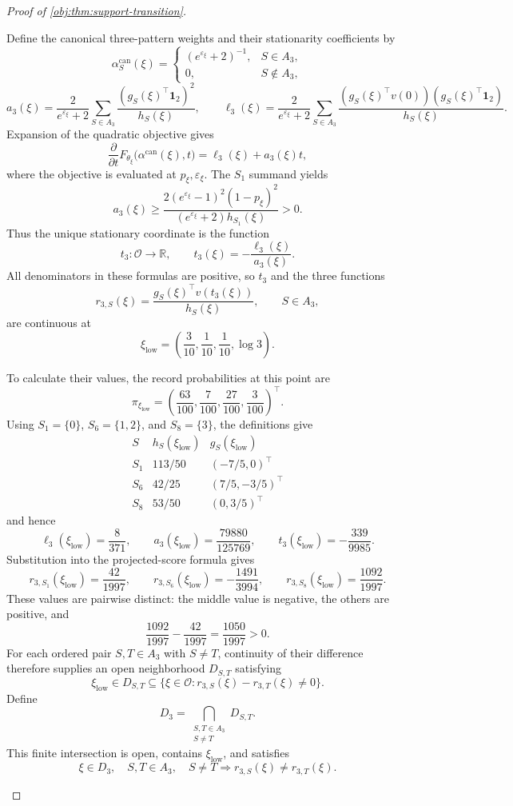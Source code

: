 \documentclass[11pt]{article}
\begin{document}
\begin{proof}[Proof of \cref{obj:thm:support-transition}]
\begin{enumerate}
Define the canonical three-pattern weights and their stationarity coefficients by
\[
\alpha^{\mathrm{can}}_S(\xi)=
\begin{cases}
(e^{\varepsilon_\xi}+2)^{-1},&S\in A_3,\\
0,&S\notin A_3,
\end{cases}
\]
\[
a_3(\xi)=\frac{2}{e^{\varepsilon_\xi}+2}
 \sum_{S\in A_3}\frac{(g_S(\xi)^\top\mathbf1_2)^2}{h_S(\xi)},
\qquad
\ell_3(\xi)=\frac{2}{e^{\varepsilon_\xi}+2}
 \sum_{S\in A_3}
 \frac{(g_S(\xi)^\top v(0))(g_S(\xi)^\top\mathbf1_2)}{h_S(\xi)}.
\]
Expansion of the quadratic objective gives
\[
\frac{\partial}{\partial t}
F_{\theta_\xi}\bigl(\alpha^{\mathrm{can}}(\xi),t\bigr)
=\ell_3(\xi)+a_3(\xi)t,
\]
where the objective is evaluated at \(p_\xi,\varepsilon_\xi\). The \(S_1\) summand yields
\[
a_3(\xi)\ge
\frac{2(e^{\varepsilon_\xi}-1)^2(1-p_\xi)^2}
 {(e^{\varepsilon_\xi}+2)h_{S_1}(\xi)}>0.
\]
Thus the unique stationary coordinate is the function
\[
t_3:\mathcal O\longrightarrow\mathbb R,
\qquad
t_3(\xi)=-\frac{\ell_3(\xi)}{a_3(\xi)}.
\]
All denominators in these formulas are positive, so \(t_3\) and the three functions
\[
r_{3,S}(\xi)=
\frac{g_S(\xi)^\top v(t_3(\xi))}{h_S(\xi)},
\qquad S\in A_3,
\]
are continuous at
\[
\xi_{\mathrm{low}}
=\left(\frac3{10},\frac1{10},\frac1{10},\log 3\right).
\]

To calculate their values, the record probabilities at this point are
\[
\pi_{\xi_{\mathrm{low}}}
=\left(\frac{63}{100},\frac7{100},\frac{27}{100},\frac3{100}\right)^\top.
\]
Using \(S_1=\{0\}\), \(S_6=\{1,2\}\), and \(S_8=\{3\}\), the definitions give
\[
\begin{array}{c|c|c}
S&h_S(\xi_{\mathrm{low}})&g_S(\xi_{\mathrm{low}})\\ \hline
S_1&113/50&(-7/5,0)^\top\\
S_6&42/25&(7/5,-3/5)^\top\\
S_8&53/50&(0,3/5)^\top
\end{array}
\]
and hence
\[
\ell_3(\xi_{\mathrm{low}})=\frac8{371},
\qquad
a_3(\xi_{\mathrm{low}})=\frac{79880}{125769},
\qquad
t_3(\xi_{\mathrm{low}})=-\frac{339}{9985}.
\]
Substitution into the projected-score formula gives
\[
r_{3,S_1}(\xi_{\mathrm{low}})=\frac{42}{1997},
\qquad
r_{3,S_6}(\xi_{\mathrm{low}})=-\frac{1491}{3994},
\qquad
r_{3,S_8}(\xi_{\mathrm{low}})=\frac{1092}{1997}.
\]
These values are pairwise distinct: the middle value is negative, the others are positive, and
\[
\frac{1092}{1997}-\frac{42}{1997}=\frac{1050}{1997}>0.
\]
For each ordered pair \(S,T\in A_3\) with \(S\ne T\), continuity of their difference therefore supplies an open neighborhood \(D_{S,T}\) satisfying
\[
\xi_{\mathrm{low}}\in D_{S,T}
\subseteq
\{\xi\in\mathcal O:r_{3,S}(\xi)-r_{3,T}(\xi)\ne0\}.
\]
Define
\[
D_3=\bigcap_{\substack{S,T\in A_3\\S\ne T}}D_{S,T}.
\]
This finite intersection is open, contains \(\xi_{\mathrm{low}}\), and satisfies
\[
\xi\in D_3,\quad S,T\in A_3,\quad S\ne T
\Longrightarrow r_{3,S}(\xi)\ne r_{3,T}(\xi).
\]


\end{enumerate}
\end{proof}
\end{document}
